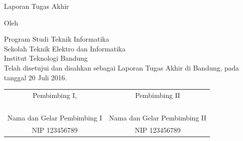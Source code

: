 %
%
%
%
%

\clearpage
\pagestyle{empty}

\begin{center}
\smallskip

    \Large \bfseries \MakeUppercase{\thetitle}
    \vfill

    \Large Laporan Tugas Akhir
    \vfill

    \large Oleh

    \Large \theauthor

    \large Program Studi Teknik Informatika \\
    Sekolah Teknik Elektro dan Informatika \\
    Institut Teknologi Bandung \\

    \vfill
    \normalsize \normalfont
    Telah disetujui dan disahkan sebagai Laporan Tugas Akhir di Bandung, pada tanggal 20 Juli 2016.

    \vfill
    \setlength{\tabcolsep}{12pt}
    \begin{tabular}{c@{\hskip 0.5in}c}
        Pembimbing I, & Pembimbing II \\
        & \\
        & \\
        & \\
        & \\
        Nama dan Gelar Pembimbing I & Nama dan Gelar Pembimbing II \\
        NIP 123456789 & NIP 123456789 \\
    \end{tabular}

\end{center}
\clearpage
